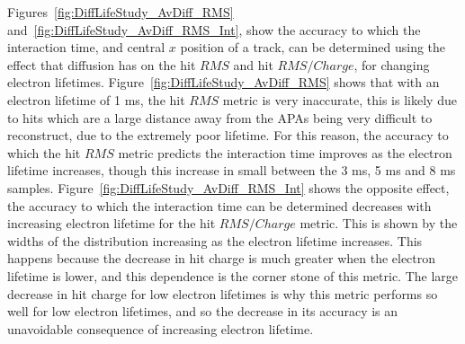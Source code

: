
Figures~\ref{fig:DiffLifeStudy_AvDiff_RMS} and~\ref{fig:DiffLifeStudy_AvDiff_RMS_Int}, show the accuracy to which the interaction time, and central $x$ position of a track, can be determined using the effect that diffusion has on the hit $RMS$ and hit $RMS/Charge$, for changing electron lifetimes. Figure~\ref{fig:DiffLifeStudy_AvDiff_RMS} shows that with an electron lifetime of 1 ms, the hit $RMS$ metric is very inaccurate, this is likely due to hits which are a large distance away from the APAs being very difficult to reconstruct, due to the extremely poor lifetime. For this reason, the accuracy to which the hit $RMS$ metric predicts the interaction time improves as the electron lifetime increases, though this increase in small between the 3 ms, 5 ms and 8 ms samples. Figure~\ref{fig:DiffLifeStudy_AvDiff_RMS_Int} shows the opposite effect, the accuracy to which the interaction time can be determined decreases with increasing electron lifetime for the hit $RMS/Charge$ metric. This is shown by the widths of the distribution increasing as the electron lifetime increases. This happens because the decrease in hit charge is much greater when the electron lifetime is lower, and this dependence is the corner stone of this metric. The large decrease in hit charge for low electron lifetimes is why this metric performs so well for low electron lifetimes, and so the decrease in its accuracy is an unavoidable consequence of increasing electron lifetime. \\

